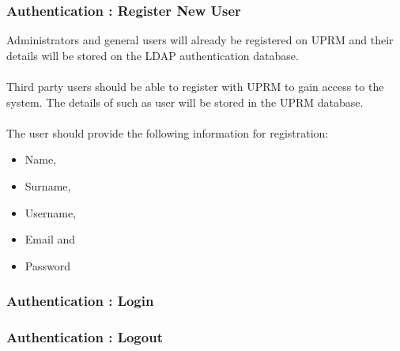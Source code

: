 \subsubsection{Authentication : Register New User}
Administrators and general users will already be registered on UPRM and their details will be stored on the LDAP authentication database.\\ \\
Third party users should be able to register with UPRM to gain access to the system. The details of such as user will be stored in the UPRM database.\\ \\
The user should provide the following information for registration:
\begin{itemize}
	\item Name,
	\item Surname,
	\item Username,
	\item Email and
	\item Password
\end{itemize}
\subsubsection{Authentication : Login}

\subsubsection{Authentication : Logout}
